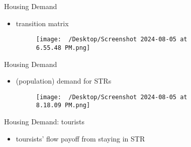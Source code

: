 \begin{frame}{Housing Demand}
    \begin{itemize}
         \item transition matrix
            \begin{figure}
                \centering
                \texttt{[image: ~/Desktop/Screenshot 2024-08-05 at 6.55.48 PM.png]}
                \caption{}
                \label{fig:photo}
            \end{figure}
    \end{itemize}
 \end{frame}

\begin{frame}{Housing Demand}
    \begin{itemize}
         \item (population) demand for STRs
            \begin{figure}
                \centering
                \caption{}
                \label{fig:photo}
            \end{figure}
            \begin{figure}
                \centering
                \texttt{[image: ~/Desktop/Screenshot 2024-08-05 at 8.18.09 PM.png]}
                \caption{}
                \label{fig:photo}
            \end{figure}
    \end{itemize}
 \end{frame}

\begin{frame}{Housing Demand: tourists}
    \begin{itemize}
         \item toursists' flow payoff from staying in STR
            \begin{figure}
                \centering
                \caption{}
                \label{fig:photo}
            \end{figure}
    \end{itemize}
 \end{frame}

